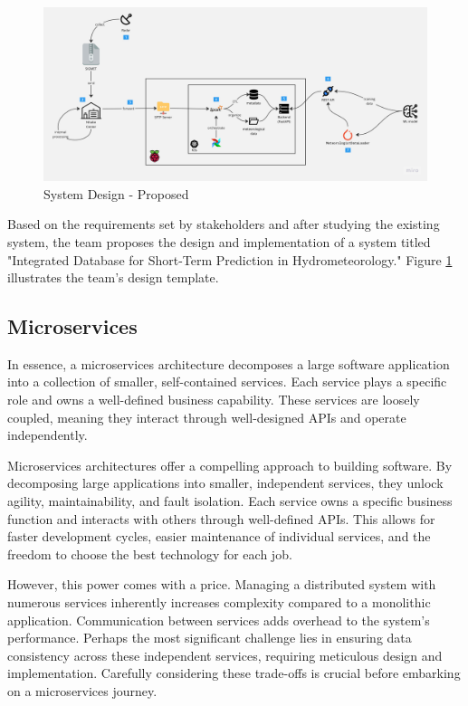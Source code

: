 \begin{figure}[H]
    \centering
    \includegraphics[width=\linewidth]{Images/4.1-architecture.jpg}
    \vspace{1em}
    \caption{System Design - Proposed}
    \label{fig:sow}
\end{figure}
\vspace{0.5cm}
Based on the requirements set by stakeholders and after studying the existing
system, the team proposes the design and implementation of a system titled
"Integrated Database for Short-Term Prediction in Hydrometeorology." Figure
\ref{fig:sow} illustrates the team's design template.
\newpage

\subsection{Microservices}

In essence, a microservices architecture decomposes a large software application
into a collection of smaller, self-contained services. Each service plays a
specific role and owns a well-defined business capability. These services are
loosely coupled, meaning they interact through well-designed APIs and operate independently.

Microservices architectures offer a compelling approach to building software. By
decomposing large applications into smaller, independent services, they unlock
agility, maintainability, and fault isolation.  Each service owns a specific
business function and interacts with others through well-defined APIs. This
allows for faster development cycles, easier maintenance of individual services,
and the freedom to choose the best technology for each job.

However, this power comes with a price. Managing a distributed system with
numerous services inherently increases complexity compared to a monolithic
application. Communication between services adds overhead to the system's
performance. Perhaps the most significant challenge lies in ensuring data
consistency across these independent services, requiring meticulous design and
implementation.  Carefully considering these trade-offs is crucial before
embarking on a microservices journey.

